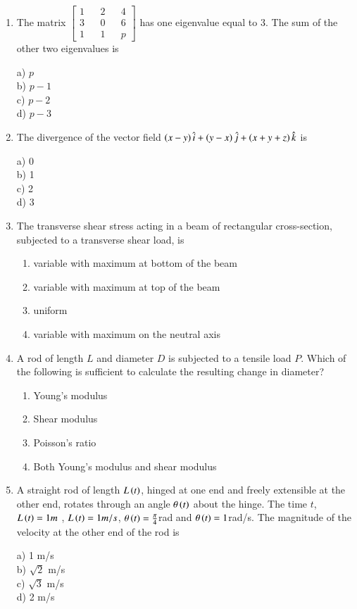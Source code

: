 \documentclass[journal]{IEEEtran}
\begin{document}
\begin{enumerate}
\item The matrix $\begin{bmatrix}1 && 2 && 4 \\ 3 && 0 && 6\\1 && 1 && p\end{bmatrix}$ has one eigenvalue equal to 3. The sum of the other two eigenvalues is
\begin{multicols}{4}
    a) $p$\\
    b) $p-1$\\
    c) $p-2$\\
    d) $p-3$
\end{multicols}
\item The divergence of the vector field $\left(x-y\right)\hat{i}
+\left(y-x\right)\hat{j}+\left(x+y+z\right)\hat{k}
$ is
\begin{multicols}{4}
    a) 0\\
    b) 1\\
    c) 2\\
    d) 3
\end{multicols}

\item The transverse shear stress acting in a beam of rectangular cross-section, subjected to a transverse shear load, is
\begin{enumerate}
    \item variable with maximum at bottom of the beam
    \item variable with maximum at top of the beam
    \item uniform
    \item variable with maximum on the neutral axis
\end{enumerate}
\item A rod of length $L$ and diameter $D$ is subjected to a tensile load $P$. Which of the following is sufficient to calculate the resulting change in diameter?
\begin{enumerate}
    \item Young's modulus
    \item Shear modulus
    \item Poisson's ratio
    \item Both Young's modulus and shear modulus
\end{enumerate}

\item A straight rod of length $L\left(t\right)$, hinged at one end and freely extensible at the other end, rotates through an angle $\theta\left(t\right)$ about the hinge. The time $t$, $L\left(t\right)=1m$ , $L\left(t\right)= 1 m/s$, $\theta\left(t\right)=\frac{\pi}{4}$rad and $\theta\left(t\right)= 1$rad/s. The magnitude of the velocity at the other end of the rod is
\begin{multicols}{4}
     a) 1 m/s\\
     b) $\sqrt{2}$ m/s\\
     c) $\sqrt{3}$ m/s\\
     d) 2 m/s
 \end{multicols}


\end{enumerate}
\end{document}
